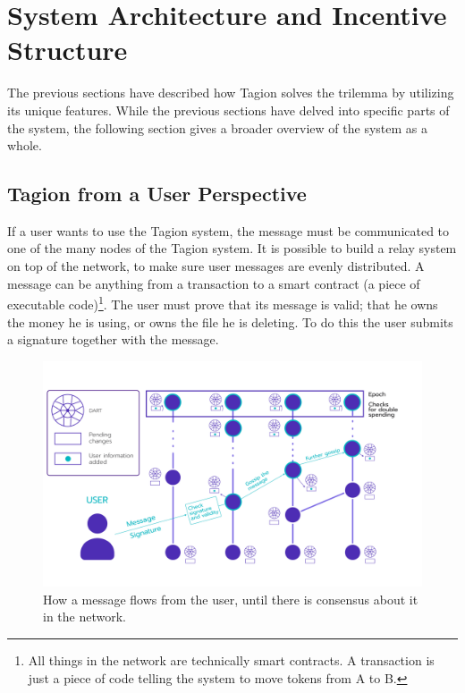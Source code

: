 \section{System Architecture and Incentive Structure}
    The previous sections have described how Tagion solves the \gls{trilemma} by utilizing its unique features. While the previous sections have delved into specific parts of the system, the following section gives a broader overview of the system as a whole.

\subsection{Tagion from a User Perspective}
    If a user wants to use the Tagion system, the message must be communicated to one of the many nodes of the Tagion system. It is possible to build a relay system on top of the network, to make sure user messages are evenly distributed. A message can be anything from a transaction to a smart contract (a piece of executable code)\footnote{All things in the network are technically smart contracts. A transaction is just a piece of code telling the system to move tokens from A to B.}. The user must prove that its message is valid; that he owns the money he is using, or owns the file he is deleting. To do this the user submits a signature together with the message.

    \begin{figure}[H]
        \centering
        \includegraphics[width=1.2\textwidth,center]{figures/system_architecture.png}
        \caption{How a message flows from the user, until there is consensus about it in the network.}
        \label{figure:system_architecture}
    \end{figure}

